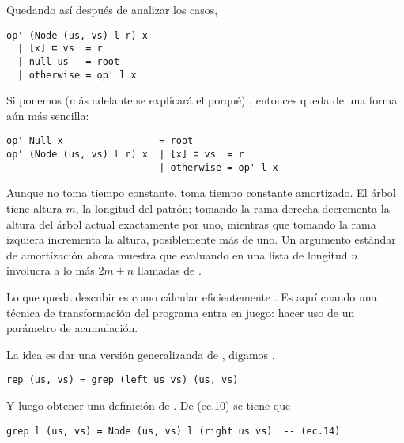 Quedando así después de analizar los casos,
\begin{verbatim}
op' (Node (us, vs) l r) x
  | [x] ⊑ vs  = r
  | null us   = root
  | otherwise = op' l x
\end{verbatim}

Si ponemos  (más adelante se explicará el porqué) %
, entonces  queda de una forma aún más sencilla:
\begin{verbatim}
op' Null x                 = root
op' (Node (us, vs) l r) x  | [x] ⊑ vs  = r
                           | otherwise = op' l x
\end{verbatim}

Aunque  no toma tiempo constante, toma tiempo constante amortizado. %
El árbol  tiene altura $m$, la longitud del patrón; tomando la rama derecha decrementa la altura del árbol actual exactamente por uno, %
mientras que tomando la rama izquiera incrementa la altura, posiblemente más de uno. %
Un argumento estándar de amortízación ahora muestra que evaluando  en una lista de longitud $n$ involucra a lo más $2m + n$ llamadas de . %

Lo que queda descubir es como cálcular eficientemente .
Es aquí cuando una técnica de transformación del programa entra en juego: %
hacer uso de un parámetro de acumulación. %

La idea es dar una versión generalizanda de , digamos .

\begin{verbatim}
rep (us, vs) = grep (left us vs) (us, vs)
\end{verbatim}

Y luego obtener una definición de . De (ec.10) se tiene que

\begin{verbatim}
grep l (us, vs) = Node (us, vs) l (right us vs)  -- (ec.14)
\end{verbatim}


